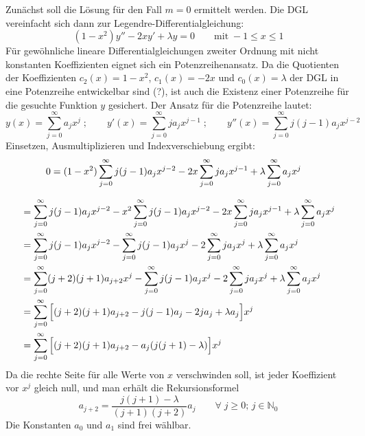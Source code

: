 \documentclass[9pt]{report}
\begin{document}
Zunächst soll die Lösung für den Fall $m=0$ ermittelt werden. Die DGL vereinfacht sich dann zur Legendre-Differentialgleichung:
\begin{equation}
(1-x^2)y''-2xy'+\lambda y=0\qquad\mathrm{mit}\;-1\leq x\leq 1
\end{equation}
Für gewöhnliche lineare Differentialgleichungen zweiter Ordnung mit nicht konstanten Koeffizienten eignet sich ein Potenzreihenansatz. Da die Quotienten der Koeffizienten $c_2(x)=1-x^2$, $c_1(x)=-2x$ und $c_0(x)=\lambda$ der DGL in eine Potenzreihe entwickelbar sind (?), ist auch die Existenz einer Potenzreihe für die gesuchte Funktion $y$ gesichert. Der Ansatz für die Potenzreihe lautet:
\begin{equation}
y(x)=\sum_{j=0}^{\infty}a_{j}x^{j}\;;\qquad y'(x)=\sum_{j=0}^{\infty}ja_jx^{j-1}\;;\qquad y''(x)=\sum_{j=0}^{\infty}j(j-1)a_jx^{j-2}
\end{equation}
Einsetzen, Ausmultiplizieren und Indexverschiebung ergibt:
\begin{align}
0&=(1-x^2)\sum_{j=0}^{\infty}j(j-1)a_jx^{j-2}-2x\sum_{j=0}^{\infty}ja_jx^{j-1}+\lambda\sum_{j=0}^{\infty}a_{j}x^{j}\notag
\end{align}

\begin{align}
&=\sum_{j=0}^{\infty}j(j-1)a_jx^{j-2}-x^2\sum_{j=0}^{\infty}j(j-1)a_jx^{j-2}-2x\sum_{j=0}^{\infty}ja_jx^{j-1}+\lambda\sum_{j=0}^{\infty}a_{j}x^{j}\notag\\
&=\sum_{j=0}^{\infty}j(j-1)a_jx^{j-2}-\sum_{j=0}^{\infty}j(j-1)a_jx^{j}-2\sum_{j=0}^{\infty}ja_jx^{j}+\lambda\sum_{j=0}^{\infty}a_{j}x^{j}\notag\\
&=\sum_{j=0}^{\infty}(j+2)(j+1)a_{j+2}x^{j}-\sum_{j=0}^{\infty}j(j-1)a_jx^{j}-2\sum_{j=0}^{\infty}ja_jx^{j}+\lambda\sum_{j=0}^{\infty}a_{j}x^{j}\notag\\
&=\sum_{j=0}^{\infty}\Big[(j+2)(j+1)a_{j+2}-j(j-1)a_{j}-2ja_{j}+\lambda a_{j}\Big]x^{j}\notag\\
&=\sum_{j=0}^{\infty}\Big[(j+2)(j+1)a_{j+2}-a_{j}(j(j+1)-\lambda)\Big]x^{j}\notag
\end{align}
Da die rechte Seite für alle Werte von $x$ verschwinden soll, ist jeder Koeffizient vor $x^j$ gleich null, und man erhält die Rekursionsformel
\begin{equation}
a_{j+2}=\frac{j(j+1)-\lambda}{(j+1)(j+2)}a_{j}\qquad\forall\;j\geq 0;\,j\in\mathbb{N}_0
\end{equation}
Die Konstanten $a_0$ und $a_1$ sind frei wählbar.
\end{document}
